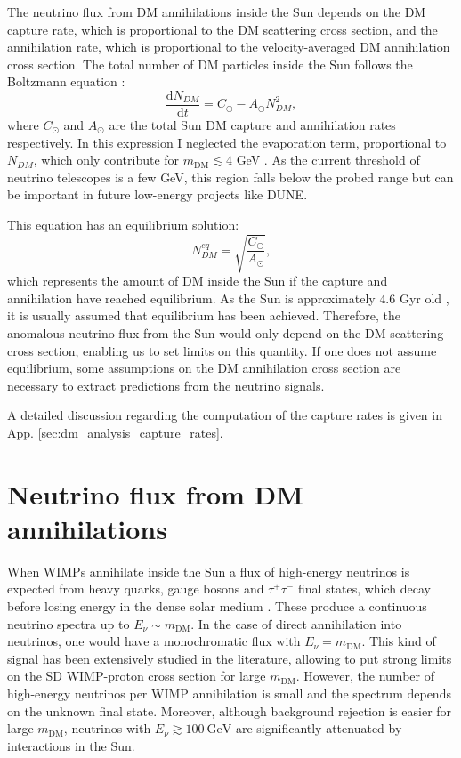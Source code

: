 The neutrino flux from DM annihilations inside the Sun depends on the DM capture rate, which is proportional to the DM scattering cross section, and the annihilation rate, which is proportional to the velocity-averaged DM annihilation cross section. The total number of DM particles inside the Sun follows the Boltzmann equation \cite{Bernal2012}:
\begin{equation}\label{2.1}
	\frac{\mathrm{d} N_{DM}}{\mathrm{d} t} = C_{\odot} - A_{\odot} N_{DM}^{2},
\end{equation}
where $C_{\odot}$ and $A_{\odot}$ are the total Sun DM capture and annihilation rates respectively. In this expression I neglected the evaporation term, proportional to $N_{DM}$, which only contribute for $m_{\mathrm{DM}}\lesssim 4$ GeV \cite{Busoni2013}. As the current threshold of neutrino telescopes is a few GeV, this region falls below the probed range but can be important in future low-energy projects like DUNE.

This equation has an equilibrium solution:
\begin{equation}\label{2.2}
	N_{DM}^{eq} = \sqrt{\frac{C_{\odot}}{A_{\odot}}},
\end{equation}
which represents the amount of DM inside the Sun if the capture and annihilation have reached equilibrium. As the Sun is approximately $4.6$ Gyr old \cite{Bahcall1995}, it is usually assumed that equilibrium has been achieved. Therefore, the anomalous neutrino flux from the Sun would only depend on the DM scattering cross section, enabling us to set limits on this quantity. If one does not assume equilibrium, some assumptions on the DM annihilation cross section are necessary to extract predictions from the neutrino signals.

A detailed discussion regarding the computation of the capture rates is given in App. \ref{sec:dm_analysis_capture_rates}.

\section{Neutrino flux from DM annihilations}
\label{sec:dm_analysis_flux}

When WIMPs annihilate inside the Sun a flux of high-energy neutrinos is expected from heavy quarks, gauge bosons and $\tau^{+}\tau^{-}$ final states, which decay before losing energy in the dense solar medium \cite{Rott2012}. These produce a continuous neutrino spectra up to $E_{\nu} \sim m_{\mathrm{DM}}$. In the case of direct annihilation into neutrinos, one would have a monochromatic flux with $E_{\nu} = m_{\mathrm{DM}}$. This kind of signal has been extensively studied  in the literature, allowing to put strong limits on the SD WIMP-proton cross section for large $m_{\mathrm{DM}}$. However, the number of high-energy neutrinos per WIMP annihilation is small and the spectrum depends on the unknown final state. Moreover, although background rejection is easier for large $m_{\mathrm{DM}}$, neutrinos with $E_{\nu} \gtrsim 100 ~ \mathrm{GeV}$ are significantly attenuated by interactions in the Sun.

